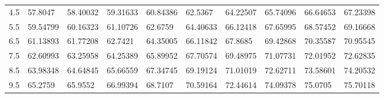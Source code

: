 \documentclass[10pt,twocolumn,letterpaper]{article}
\begin{document}
\begin{table}
{\begin{tabular}{llllllllll}
    4.5             & 57.8047                                & 58.40032                               & 59.31633                                & 60.84386                                & 62.5367                                 & 64.22507                                & 65.74096                                & 66.64653                                & 67.23398                                \\
    5.5             & 59.54799                               & 60.16323                               & 61.10726                                & 62.6759                                 & 64.40633                                & 66.12418                                & 67.65995                                & 68.57452                                & 69.16668                                \\
    6.5             & 61.13893                               & 61.77208                               & 62.7421                                 & 64.35005                                & 66.11842                                & 67.8685                                 & 69.42868                                & 70.35587                                & 70.95545                                \\
    7.5             & 62.60993                               & 63.25958                               & 64.25389                                & 65.89952                                & 67.70574                                & 69.48975                                & 71.07731                                & 72.01952                                & 72.62835                                \\
    8.5             & 63.98348                               & 64.64845                               & 65.66559                                & 67.34745                                & 69.19124                                & 71.01019                                & 72.62711                                & 73.58601                                & 74.20532                                \\
    9.5             & 65.2759                                & 65.9552                                & 66.99394                                & 68.7107                                 & 70.59164                                & 72.44614                                & 74.09378                                & 75.0705                                 & 75.70118                                \\

\end{tabular}}
\end{table}
\end{document}
